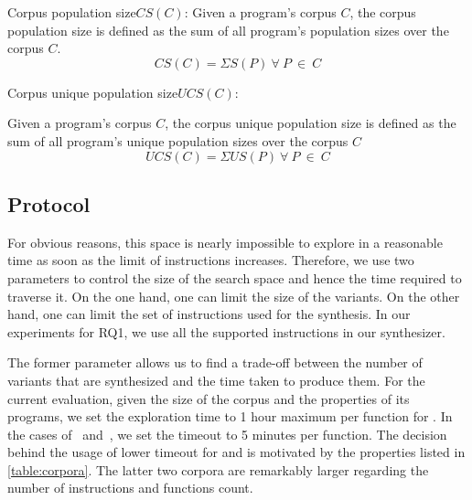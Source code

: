 \newcommand{\corpuspopulationsizename}{Corpus population size\xspace}
\newcommand{\corpusuniquepopulationsizename}{Corpus unique population size\xspace}

\begin{metric}{\corpuspopulationsizename$CS(C)$:}\label{metric:rq1:corpus_pop}
    Given a program's corpus $C$, the corpus population size is defined as the sum of all program's population sizes over the corpus $C$.\\
    $$
        CS(C)=\Sigma{S(P)}\ \forall\ P\ \in\ C
    $$
\end{metric}

\begin{metric}{\corpusuniquepopulationsizename$UCS(C)$:}\label{metric:rq1:corpus_pop_unique}

    Given a program's corpus $C$, the corpus unique population size is defined as the sum of all program's unique population sizes over the corpus $C$\\
    $$
    UCS(C)=\Sigma{US(P)}\ \forall\ P\ \in\ C
    $$
\end{metric}


\subsection*{Protocol}
 For obvious reasons, this space is nearly impossible to explore in a reasonable time as soon as the limit of instructions increases.
Therefore, we use two parameters to control the size of the search space and hence the time required to traverse it.
On the one hand, one can limit the size of the variants. On the other hand, one can limit the set of instructions used for the synthesis. In our experiments for RQ1, we use all the  supported instructions in our synthesizer.


The former parameter allows us to find a trade-off between the number of variants that are synthesized and the time taken to produce them. For the current evaluation, given the size of the corpus and the properties of its programs, we set the exploration time to 1 hour maximum per function for \corpusrosetta. In the cases of \corpussodium\ and\ \corpusqrcode, we set the timeout to 5 minutes per function. The decision behind the usage of lower timeout for \corpussodium
and \corpusqrcode is motivated by the properties listed in \autoref{table:corpora}. The latter two corpora are remarkably larger regarding the number of instructions and functions count. 

